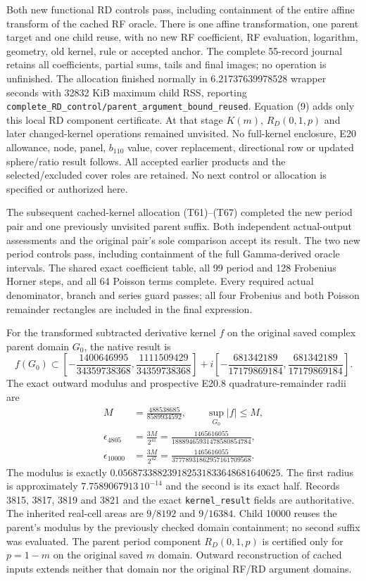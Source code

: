 \documentclass[10pt]{article}
\begin{document}
Both new functional RD controls pass, including containment
of the entire affine transform of the cached RF oracle.
There is one affine transformation, one parent target and
one child reuse, with no new RF coefficient, RF evaluation,
logarithm, geometry, old kernel, rule or accepted anchor.
The complete 55-record journal retains all coefficients,
partial sums, tails and final images; no operation is
unfinished. The allocation finished normally in
6.21737639978528 wrapper seconds with 32832 KiB maximum
child RSS, reporting
\texttt{complete\_RD\_control/parent\_argument\_bound\_reused}.
Equation (9) adds only this local RD component certificate.
At that stage $K(m)$, $R_D(0,1,p)$ and later changed-kernel
operations remained unvisited. No full-kernel enclosure, E20 allowance,
node, panel, $b_{110}$ value, cover replacement, directional
row or updated sphere/ratio result follows.
All accepted earlier products and the selected/excluded
cover roles are retained. No next control or allocation
is specified or authorized here.

The subsequent cached-kernel allocation (T61)--(T67)
completed the new period pair and one previously unvisited
parent suffix. Both independent actual-output assessments
and the original pair's sole comparison accept its result.
The two new period controls pass, including containment of
the full Gamma-derived oracle intervals. The shared exact
coefficient table, all 99 period and 128 Frobenius Horner
steps, and all 64 Poisson terms complete. Every required
actual denominator, branch and series guard passes; all
four Frobenius and both Poisson remainder rectangles are
included in the final expression.

For the transformed subtracted derivative kernel $f$ on
the original saved complex parent domain $G_0$, the native
result is
\[
 f(G_0)\subset
 \left[-\frac{1400646995}{34359738368},
             \frac{1111509429}{34359738368}\right]
 +i\left[-\frac{681342189}{17179869184},
              \frac{681342189}{17179869184}\right].
                                                               \tag{10}
\]
The exact outward modulus and prospective E20.8
quadrature-remainder radii are
\[
 \begin{split}
 M&=\frac{488538685}{8589934592},\qquad
       \sup_{G_0}|f|\leq M,\\
 \epsilon_{4805}
   &=\frac{3M}{2^{41}}
     =\frac{1465616055}{18889465931478580854784},\\
 \epsilon_{10000}
   &=\frac{3M}{2^{42}}
     =\frac{1465616055}{37778931862957161709568}.
 \end{split}                                                   \tag{11}
\]
The modulus is exactly
$0.056873388239182531833648681640625$.
The first radius is approximately
$7.7589067913\,10^{-14}$ and the second is its exact half.
Records 3815, 3817, 3819 and 3821 and the exact
\texttt{kernel\_result} fields are authoritative.
The inherited real-cell areas are $9/8192$ and $9/16384$.
Child 10000 reuses the parent's modulus by the previously
checked domain containment; no second suffix was evaluated.
The parent period component $R_D(0,1,p)$ is certified only
for $p=1-m$ on the original saved $m$ domain.
Outward reconstruction of cached inputs extends neither
that domain nor the original RF/RD argument domains.
\end{document}
